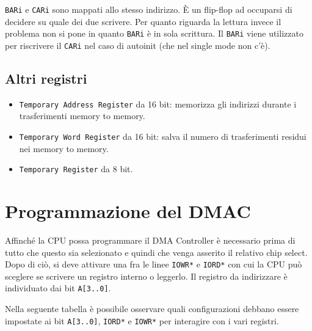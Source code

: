 \documentclass[11pt]{book}
\begin{document}
\texttt{BARi} e \texttt{CARi} sono mappati allo stesso indirizzo. \`E
un flip-flop ad occuparsi di decidere su quale dei due scrivere. Per
quanto riguarda la lettura invece il problema non si pone in quanto
\texttt{BARi} \`e in sola scrittura. Il \texttt{BARi} viene utilizzato
per riscrivere il \texttt{CARi} nel caso di autoinit (che nel single
mode non c'\`e).

\subsection{Altri registri}

\begin{itemize}
 
\item \texttt{Temporary Address Register} da 16 bit: memorizza gli
  indirizzi durante i trasferimenti memory to memory.

\item \texttt{Temporary Word Register} da 16 bit: salva il numero di
  trasferimenti residui nei memory to memory.

\item \texttt{Temporary Register} da 8 bit.

\end{itemize}

\section{Programmazione del DMAC}

Affinch\'e la CPU possa programmare il DMA Controller \`e necessario
prima di tutto che questo sia selezionato e quindi che venga asserito
il relativo chip select. Dopo di ci\`o, si deve attivare una fra le
linee \texttt{IOWR*} e \texttt{IORD*} con cui la CPU pu\`o sceglere se
scrivere un registro interno o leggerlo. Il registro da indirizzare
\`e individuato dai bit \texttt{A[3..0]}.

Nella seguente tabella \`e possibile osservare quali configurazioni
debbano essere impostate ai bit \texttt{A[3..0]}, \texttt{IORD*} e
\texttt{IOWR*} per interagire con i vari registri.
\end{document}
